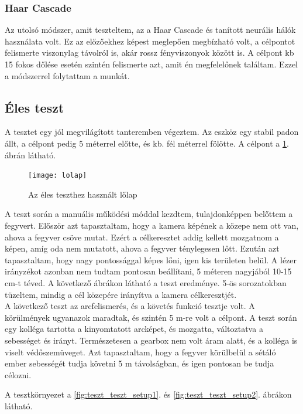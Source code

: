 \documentclass[12pt,a4paper]{article}
\begin{document}
\subsubsection{Haar Cascade}
Az utolsó módszer, amit teszteltem, az a Haar Cascade és tanított neurális hálók használata volt. Ez az előzőekhez képest meglepően megbízható volt, a célpontot felismerte viszonylag távolról is, akár rossz fényviszonyok között is. A célpont kb 15 fokos dőlése esetén szintén felismerte azt, amit én megfelelőnek találtam. Ezzel a módszerrel folytattam a munkát.



\subsection{Éles teszt}
A tesztet egy jól megvilágított tanteremben végeztem. Az eszköz egy stabil padon állt, a célpont pedig 5 méterrel előtte, és kb. fél méterrel fölötte. A célpont a \ref{fig:teszt_lolap}. ábrán látható.

\begin{figure}[h!]
	\centering
	\texttt{[image: lolap]}
	\caption{Az éles teszthez használt lőlap}
	\label{fig:teszt_lolap}
\end{figure}


A teszt során a manuális működési móddal kezdtem, tulajdonképpen belőttem a fegyvert. Először azt tapasztaltam, hogy a kamera képének a közepe nem ott van, ahova a fegyver csöve mutat. Ezért a célkeresztet addig kellett mozgatnom a képen, amíg oda nem mutatott, ahova a fegyver ténylegesen lőtt. Ezután azt tapasztaltam, hogy nagy pontossággal képes lőni, igen kis területen belül. A lézer irányzékot azonban nem tudtam pontosan beállítani, 5 méteren nagyjából 10-15 cm-t téved. A következő ábrákon látható a teszt eredménye. 5-ös sorozatokban tüzeltem, mindig a cél közepére irányítva a kamera célkeresztjét. \\

A következő teszt az arcfelismerés, és a követés funkció tesztje volt. A körülmények ugyanazok maradtak, és szintén 5 m-re volt a célpont. A teszt során egy kolléga tartotta a kinyomtatott arcképet, és mozgatta, változtatva a sebességet és irányt. Természetesen a gearbox nem volt áram alatt, és a kolléga is viselt védőszemüveget. Azt tapasztaltam, hogy a fegyver körülbelül a sétáló ember sebességét tudja követni 5 m távolságban, és igen pontosan be tudja célozni.

\pagebreak

A tesztkörnyezet a \ref{fig:teszt_teszt_setup1}. és \ref{fig:teszt_teszt_setup2}. ábrákon látható.
\end{document}
